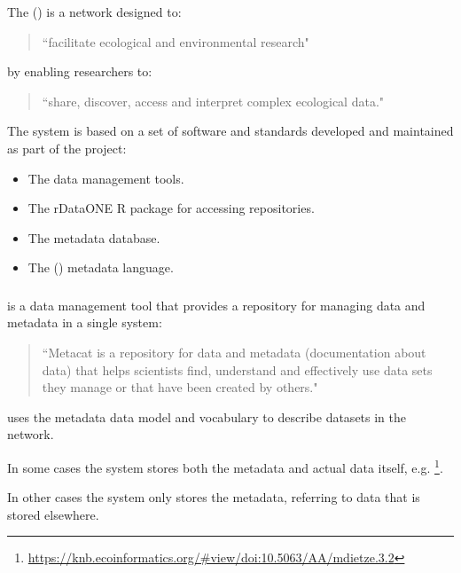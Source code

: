 \documentclass{article}
\begin{document}
The  ({\cite{knb}}) is a network designed to:

\begin{quote}
    ``facilitate ecological and environmental research"
\end{quote}

by enabling researchers to:

\begin{quote}
    ``share, discover, access and interpret complex ecological data."
\end{quote}

The \cite{knb} system is based on a set of \cite{open-source} software and
standards developed and maintained as part of the \cite{knb} project:

\begin{itemize}
    \item The \cite{morpho} data management tools.
    \item The rDataONE R package for accessing \cite{data-one} repositories.
    \item The \cite{metacat} metadata database.
    \item The  (\cite{eml}) metadata language.
\end{itemize}

\subsubsection{}

\cite{metacat} is a data management tool that provides a repository for
managing data and metadata in a single system:

\begin{quote}
``Metacat is a repository for data and metadata (documentation about data)
that helps scientists find, understand and effectively use data sets they
manage or that have been created by others."
\end{quote}

\cite{metacat} uses the \cite{eml} metadata data model and vocabulary to
describe datasets in the network.

In some cases the \cite{metacat} system stores both the metadata and actual
data itself, e.g.
\footnote{\url{https://knb.ecoinformatics.org/#view/doi:10.5063/AA/mdietze.3.2}}.

In other cases the \cite{metacat} system only stores the metadata, referring
to data that is stored elsewhere.
\end{document}
